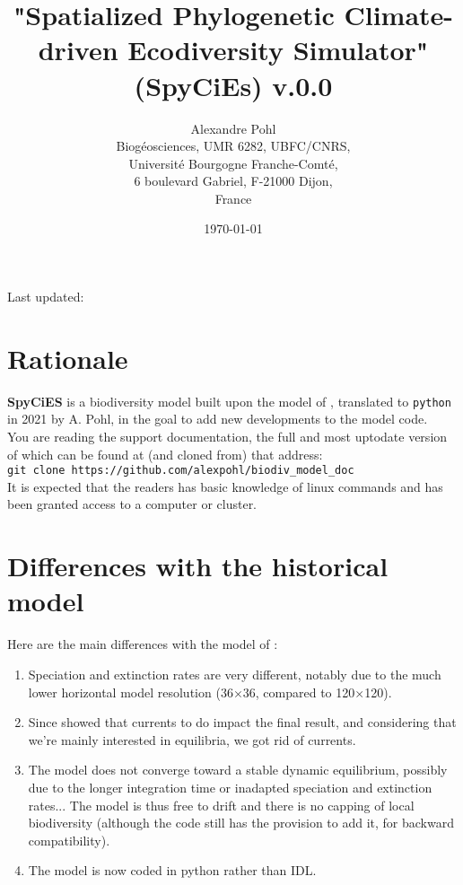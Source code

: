 \documentclass[a4paper, 11pt]{article}
\title{"Spatialized Phylogenetic Climate-driven Ecodiversity Simulator" (SpyCiEs) v.0.0}
\author{Alexandre Pohl\\ Biogéosciences, UMR 6282, UBFC/CNRS,\\ Université Bourgogne Franche-Comté,\\ 6 boulevard Gabriel, F-21000 Dijon,\\ France}
\date{}
\newcommand\code[1]{%
\texttt{#1}%
}
\begin{document}
\maketitle

Last updated: \date{\today}

\tableofcontents

\section{Rationale}

\textbf{SpyCiES} is a biodiversity model built upon the model of \citet{Brayard2004,Brayard2005}, translated to \code{python} in 2021 by A. Pohl, in the goal to add new developments to the model code.\\

You are reading the support documentation, the full and most uptodate version of which can be found at (and cloned from) that address:\\

\code{git clone https://github.com/alexpohl/biodiv\_model\_doc}\\

It is expected that the readers has basic knowledge of linux commands and has been granted access to a computer or cluster.

\section{Differences with the historical model}

Here are the main differences with the model of \citet{Brayard2004,Brayard2005}:
\begin{enumerate}
    \item Speciation and extinction rates are very different, notably due to the much lower horizontal model resolution (36$\times$36, compared to 120$\times$120).
    \item Since \citet{Brayard2004,Brayard2005} showed that currents to do impact the final result, and considering that we're mainly interested in equilibria, we got rid of currents.
    \item The model does not converge toward a stable dynamic equilibrium, possibly due to the longer integration time or inadapted speciation and extinction rates... The model is thus free to drift and there is no capping of local biodiversity (although the code still has the provision to add it, for backward compatibility).
    \item The model is now coded in python rather than IDL. 
\end{enumerate}
\end{document}
